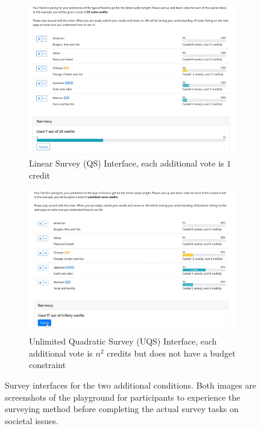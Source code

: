 
\begin{figure}
    \centering
    \begin{subfigure}{0.47\textwidth}
        \centering
        \includegraphics[width=\textwidth]{content/image/linear.png}
        \caption{Linear Survey (QS) Interface, each additional vote is $1$ credit}
        \label{fig:qs_interface}
    \end{subfigure}
    \hfill
    \begin{subfigure}{0.47\textwidth}
        \centering
        \includegraphics[width=\textwidth]{content/image/uqs.png}
        \caption{Unlimited Quadratic Survey (UQS) Interface, each additional vote is $n^2$ credits but does not have a budget constraint}
        \label{fig:css_interface}
    \end{subfigure}
    \caption{Survey interfaces for the two additional conditions. Both images are screenshots of the playground for participants to experience the surveying method before completing the actual survey tasks on societal issues.}
    \label{fig:extended_interface}
\end{figure}


